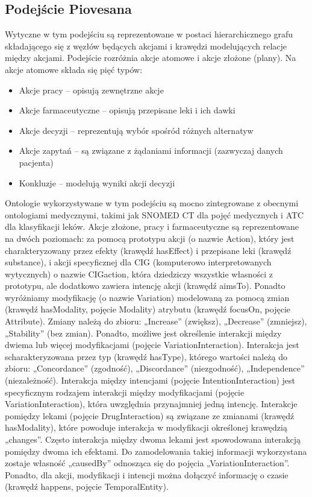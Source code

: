 \documentclass[oneside,a4paper]{book}
\begin{document}
\begin{spacing}{1.5}
\subsection{Podejście Piovesana}

Wytyczne w tym podejściu są reprezentowane w postaci hierarchicznego grafu składającego się z węzłów będących akcjami i krawędzi modelujących relacje między akcjami.\cite{Piovesan} Podejście rozróżnia akcje atomowe i akcje złożone (plany). Na akcje atomowe składa się pięć typów:
\begin{itemize}
\item{Akcje pracy – opisują zewnętrzne akcje}
\item{Akcje farmaceutyczne – opisują przepisane leki i ich dawki}
\item{Akcje decyzji – reprezentują wybór spośród różnych alternatyw}
\item{Akcje zapytań – są związane z żądaniami informacji (zazwyczaj danych pacjenta)}
\item{Konkluzje – modelują wyniki akcji decyzji}
\end{itemize}
Ontologie wykorzystywane w tym podejściu są mocno zintegrowane z obecnymi ontologiami medycznymi, takimi jak SNOMED CT dla pojęć medycznych i ATC dla klasyfikacji leków. Akcje złożone, pracy i farmaceutyczne są reprezentowane na dwóch poziomach: za pomocą prototypu akcji (o nazwie Action), który jest charakteryzowany przez efekty (krawędź hasEffect) i przepisane leki (krawędź substance), i akcji specyficznej dla CIG (komputerowo interpretowanych wytycznych) o nazwie CIGaction, która dziedziczy wszystkie własności z prototypu, ale dodatkowo zawiera intencję akcji (krawędź aimsTo). Ponadto wyróżniamy modyfikację (o nazwie Variation) modelowaną za pomocą zmian (krawędź hasModality, pojęcie Modality) atrybutu (krawędź focusOn, pojęcie Attribute). Zmiany należą do zbioru: „Increase” (zwiększ), „Decrease” (zmniejsz), „Stability” (bez zmian). Ponadto, możliwe jest określenie interakcji między dwiema lub więcej modyfikacjami (pojęcie VariationInteraction). Interakcja jest scharakteryzowana przez typ (krawędź hasType), którego wartości należą do zbioru: „Concordance” (zgodność), „Discordance” (niezgodność), „Independence” (niezależność). Interakcja między intencjami (pojęcie IntentionInteraction) jest specyficznym rodzajem interakcji między modyfikacjami (pojęcie VariationInteraction), która uwzględnia przynajmniej jedną intencję. Interakcje pomiędzy lekami (pojęcie DrugInteraction) są związane ze zmianami (krawędź hasModality), które powoduje interakcja w modyfikacji określonej krawędzią „changes”. Często interakcja między dwoma lekami jest spowodowana interakcją pomiędzy dwoma ich efektami. Do zamodelowania takiej informacji wykorzystana zostaje własność „causedBy” odnosząca się do pojęcia „VariationInteraction”. Ponadto, dla akcji, modyfikacji i intencji można dołączyć informację o czasie (krawędź happens, pojęcie TemporalEntity).


\end{spacing}
\end{document}
